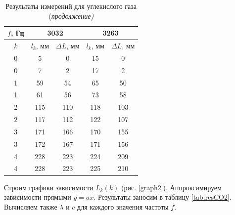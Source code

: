 \documentclass[a4paper, 12pt]{article}
\begin{document}
            \begin{table}[H]
                \centering
                \begin{tabular}{|c|cc|cc|}
                    \hline
                    $f$, Гц & \multicolumn{2}{c|}{3032} & \multicolumn{2}{c|}{3263} \\ \hline
                    $k$ & \multicolumn{1}{c|}{$l_k$, мм} & $\Delta L$, мм & \multicolumn{1}{c|}{$l_k$, мм} & $\Delta L$, мм \\ \hline
                    0     & \multicolumn{1}{c|}{5} & 0 & \multicolumn{1}{c|}{15}       & 0 \\ \hline
                    0 & \multicolumn{1}{c|}{7} & 2 & \multicolumn{1}{c|}{17}       & 2 \\ \hline
                    1     & \multicolumn{1}{c|}{59} & 54 & \multicolumn{1}{c|}{65} & 50 \\ \hline
                    1 & \multicolumn{1}{c|}{61} & 56 & \multicolumn{1}{c|}{73} & 58 \\ \hline
                    2 & \multicolumn{1}{c|}{115} & 110 & \multicolumn{1}{c|}{118}      & 103 \\ \hline
                    2 & \multicolumn{1}{c|}{117} & 112 & \multicolumn{1}{c|}{122}      & 107 \\ \hline
                    3 & \multicolumn{1}{c|}{171} & 166 & \multicolumn{1}{c|}{170}      & 155 \\ \hline
                    3 & \multicolumn{1}{c|}{172} & 167 & \multicolumn{1}{c|}{171}      & 156      \\ \hline
                    4 & \multicolumn{1}{c|}{228} & 223 & \multicolumn{1}{c|}{224}      & 209 \\ \hline
                    4 & \multicolumn{1}{c|}{228} & 223 & \multicolumn{1}{c|}{225}      & 210 \\ \hline
                \end{tabular}
                \caption{Результаты измерений для углекислого газа (\textit{продолжение)}}
                \label{tab:CO2_2}
            \end{table}

            \noindent Строим графики зависимости $L_k(k)$ (рис. \ref{graph2}). Аппроксимируем зависимости прямыми $y=ax$. Результаты заносим в таблицу \ref{tab:resCO2}. Вычисляем также $\lambda$ и $c$ для каждого значения частоты $f$.
\end{document}
